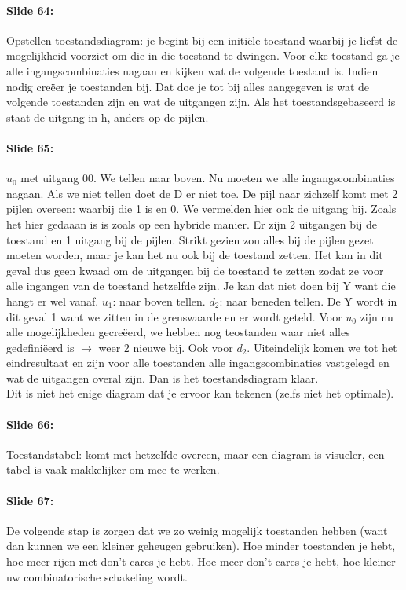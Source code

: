 \documentclass[10pt,a4paper]{book}
\begin{document}
\paragraph{Slide 64:} Opstellen toestandsdiagram: je begint bij een initi\"ele toestand waarbij je liefst de mogelijkheid voorziet om die in die toestand te dwingen. Voor elke toestand ga je alle ingangscombinaties nagaan en kijken wat de volgende toestand is. Indien nodig cre\"eer je toestanden bij. Dat doe je tot bij alles aangegeven is wat de volgende toestanden zijn en wat de uitgangen zijn. Als het toestandsgebaseerd is staat de uitgang in h, anders op de pijlen.

\paragraph{Slide 65:} $u_0$ met uitgang 00. We tellen naar boven. Nu moeten we alle ingangscombinaties nagaan. Als we niet tellen doet de D er niet toe. De pijl naar zichzelf komt met 2 pijlen overeen: waarbij die 1 is en 0. We vermelden hier ook de uitgang bij. Zoals het hier gedaaan is is zoals op een hybride manier. Er zijn 2 uitgangen bij de toestand en 1 uitgang bij de pijlen. Strikt gezien zou alles bij de pijlen gezet moeten worden, maar je kan het nu ook bij de toestand zetten. Het kan in dit geval dus geen kwaad om de uitgangen bij de toestand te zetten zodat ze voor alle ingangen van de toestand hetzelfde zijn. Je kan dat niet doen bij Y want die hangt er wel vanaf. $u_1$: naar boven tellen. $d_2$: naar beneden tellen. De Y wordt in dit geval 1 want we zitten in de grenswaarde en er wordt geteld. Voor $u_0$ zijn nu alle mogelijkheden gecre\"eerd, we hebben nog teostanden waar niet alles gedefini\"eerd is $\rightarrow$ weer 2 nieuwe bij. Ook voor $d_2$. Uiteindelijk komen we tot het eindresultaat en zijn voor alle toestanden alle ingangscombinaties vastgelegd en wat de uitgangen overal zijn. Dan is het toestandsdiagram klaar.\\
Dit is niet het enige diagram dat je ervoor kan tekenen (zelfs niet het optimale). 

\paragraph{Slide 66:} Toestandstabel: komt met hetzelfde overeen, maar een diagram is visueler, een tabel is vaak makkelijker om mee te werken. 

\paragraph{Slide 67:} De volgende stap is zorgen dat we zo weinig mogelijk toestanden hebben (want dan kunnen we een kleiner geheugen gebruiken). Hoe minder toestanden je hebt, hoe meer rijen met don't cares je hebt. Hoe meer don't cares je hebt, hoe kleiner uw combinatorische schakeling wordt. 
\end{document}
